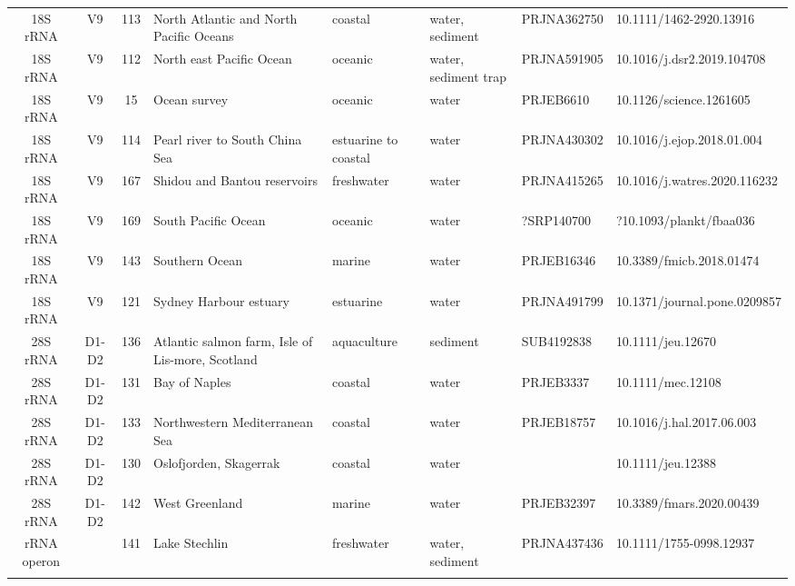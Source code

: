 \begin{longtable}{ccclllll}
  18S rRNA & V9 & 113 & North Atlantic and North Pacific Oceans & coastal & water, sediment & PRJNA362750 & 10.1111/1462-2920.13916 \\ 
  18S rRNA & V9 & 112 & North east Pacific Ocean & oceanic & water, sediment trap & PRJNA591905 & 10.1016/j.dsr2.2019.104708 \\ 
  18S rRNA & V9 & 15 & Ocean survey & oceanic & water & PRJEB6610 & 10.1126/science.1261605 \\ 
  18S rRNA & V9 & 114 & Pearl river to South China Sea & estuarine to coastal & water & PRJNA430302 & 10.1016/j.ejop.2018.01.004 \\ 
  18S rRNA & V9 & 167 & Shidou and Bantou reservoirs & freshwater & water & PRJNA415265 & 10.1016/j.watres.2020.116232 \\ 
  18S rRNA & V9 & 169 & South Pacific Ocean & oceanic & water & ?SRP140700 & ?10.1093/plankt/fbaa036 \\ 
  18S rRNA & V9 & 143 & Southern Ocean & marine & water & PRJEB16346 & 10.3389/fmicb.2018.01474 \\ 
  18S rRNA & V9 & 121 & Sydney Harbour estuary & estuarine & water & PRJNA491799 & 10.1371/journal.pone.0209857 \\ 
  28S rRNA & D1-D2 & 136 & Atlantic salmon farm, Isle of Lis-more, Scotland & aquaculture & sediment & SUB4192838 & 10.1111/jeu.12670 \\ 
  28S rRNA & D1-D2 & 131 & Bay of Naples & coastal & water & PRJEB3337 & 10.1111/mec.12108 \\ 
  28S rRNA & D1-D2 & 133 & Northwestern Mediterranean Sea & coastal & water & PRJEB18757 & 10.1016/j.hal.2017.06.003 \\ 
  28S rRNA & D1-D2 & 130 & Oslofjorden, Skagerrak & coastal & water &  & 10.1111/jeu.12388 \\ 
  28S rRNA & D1-D2 & 142 & West Greenland & marine & water & PRJEB32397 & 10.3389/fmars.2020.00439 \\ 
  rRNA operon &  & 141 & Lake Stechlin & freshwater & water, sediment & PRJNA437436 & 10.1111/1755-0998.12937 \\ 
   \hline
\hline
\label{tabsup:datasets}
\end{longtable}

